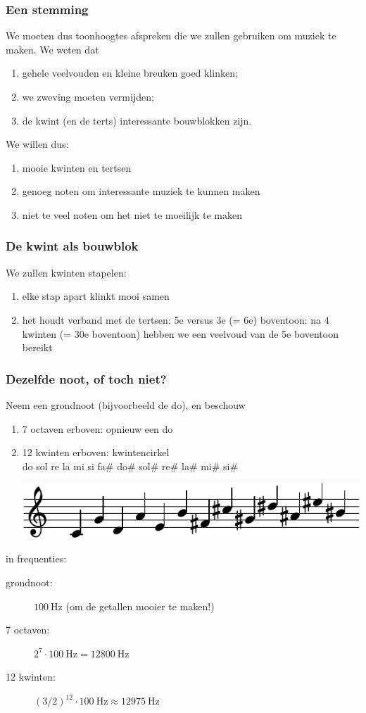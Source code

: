 \documentclass[compress, darktitle, framenumber, totalframenumber]{beamer}
\begin{document}
\begin{frame}
  \frametitle{Een stemming}

  We moeten dus toonhoogtes afspreken die we zullen gebruiken om muziek te maken. We weten dat
  \begin{enumerate}
    \item gehele veelvouden en kleine breuken goed klinken;
    \item we zweving moeten vermijden;
    \item de kwint (en de terts) interessante bouwblokken zijn.
  \end{enumerate}
  \pause
  We willen dus:
  \begin{enumerate}
    \item mooie kwinten en tertsen
    \item genoeg noten om interessante muziek te kunnen maken
    \item niet te veel noten om het niet te moeilijk te maken
  \end{enumerate}
\end{frame}

\begin{frame}
  \frametitle{De kwint als bouwblok}

  We zullen kwinten stapelen:
  \begin{enumerate}
    \item elke stap apart klinkt mooi samen
    \item het houdt verband met de tertsen: 5e versus 3e (= 6e) boventoon: na 4 kwinten (= 30e boventoon) hebben we een veelvoud van de 5e boventoon bereikt
  \end{enumerate}
\end{frame}

\begin{frame}
  \frametitle{Dezelfde noot, of toch niet?}

  Neem een grondnoot (bijvoorbeeld de do), en beschouw
  \begin{enumerate}
    \item 7 octaven erboven: opnieuw een do
      \pause
    \item 12 kwinten erboven: \alert{kwintencirkel} \\
      do sol re la mi si fa\# do\# sol\# re\# la\# mi\# si\#

      \includegraphics{scores/circle-cropped}
  \end{enumerate}
  \pause
  in frequenties:
  \begin{description}
    \item[grondnoot:] $\SI{100}{\hertz}$ (om de getallen mooier te maken!)
    \item[7 octaven:] $2^7\cdot\SI{100}{\hertz}=\SI{12800}{\hertz}$ 
      \pause
    \item[12 kwinten:] $(3/2)^{12}\cdot\SI{100}{\hertz}\approx\SI{12975}{\hertz}$
  \end{description}
\end{frame}
\end{document}
